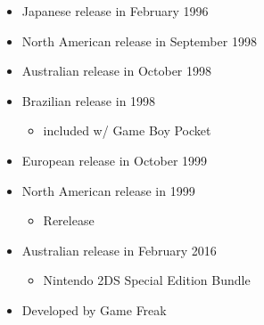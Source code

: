 \documentclass{book}
\begin{document}
\begin{itemize} [nosep]




\item Japanese release in February 1996







\item North American release in September 1998







\item Australian release in October 1998







\item Brazilian release in 1998
\begin{itemize} [nosep]\item included w/ Game Boy Pocket\end{itemize}\noindent






\item European release in October 1999







\item North American release in 1999
\begin{itemize} [nosep]\item Rerelease\end{itemize}\noindent





















\item Australian release in February 2016
\begin{itemize} [nosep]\item Nintendo 2DS Special Edition Bundle\end{itemize}\noindent
















\item Developed by Game Freak

\end{itemize}\noindent
\end{document}
